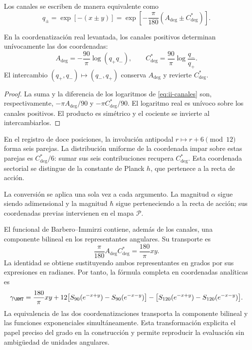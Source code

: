 Los canales se escriben de manera equivalente como
\begin{equation}
 q_\pm=\exp[-(x\pm y)]
 =\exp\!\left[-\frac{\pi}{180}(A_{\deg}\pm C^*_{\deg})\right].
\label{eq:ii-canales}
\end{equation}
\begin{proposition}
\label{prop:ii-inversion-canales-angulares}
En la coordenatización real levantada, los canales positivos determinan
unívocamente las dos coordenadas:
\[
 A_{\deg}=-\frac{90}{\pi}\log(q_+q_-),\qquad
 C^*_{\deg}=\frac{90}{\pi}\log\frac{q_-}{q_+}.
\]
El intercambio \((q_+,q_-)\mapsto(q_-,q_+)\) conserva
\(A_{\deg}\) y revierte \(C^*_{\deg}\).
\end{proposition}
\begin{proof}
La suma y la diferencia de los logaritmos de
\eqref{eq:ii-canales} son, respectivamente,
\(-\pi A_{\deg}/90\) y \(-\pi C^*_{\deg}/90\).
El logaritmo real es unívoco sobre los canales positivos.
El producto es simétrico y el cociente se invierte al intercambiarlos.
\end{proof}
En el registro de doce posiciones, la involución antipodal
\(r\mapsto r+6\pmod {12}\) forma seis parejas. La distribución
uniforme de la coordenada impar sobre estas parejas es
\(C^*_{\deg}/6\): sumar sus seis contribuciones recupera
\(C^*_{\deg}\). Esta coordenada sectorial se distingue de
la constante de Planck \(h\), que pertenece a la recta de acción.

La conversión se aplica una sola vez a cada argumento. La magnitud
\(\alpha\) sigue siendo adimensional y la magnitud \(\hbar\)
sigue perteneciendo a la recta de acción; sus coordenadas previas
intervienen en el mapa \(\mathcal P\).

El funcional de Barbero--Immirzi contiene, además de los canales, una
componente bilineal en los representantes angulares. Su transporte es
\begin{equation}
 \frac{\pi}{180}A_{\deg}C^*_{\deg}
 =\frac{180}{\pi}xy.
 \label{eq:ii-barbero-cartas}
\end{equation}
La identidad se obtiene sustituyendo ambos representantes en grados
por sus expresiones en radianes. Por tanto, la fórmula completa en
coordenadas analíticas es
\[
 \gamma_{\HMT}
 =\frac{180}{\pi}xy
 +12\bigl[S_{90}(e^{-x+y})-S_{90}(e^{-x-y})\bigr]
 -\bigl[S_{120}(e^{-x+y})-S_{120}(e^{-x-y})\bigr].
\]
La equivalencia de las dos coordenatizaciones transporta la componente bilineal
y las funciones exponenciales simultáneamente. Esta transformación
explicita el papel preciso del grado en la construcción y permite
reproducir la evaluación sin ambigüedad de unidades angulares.
